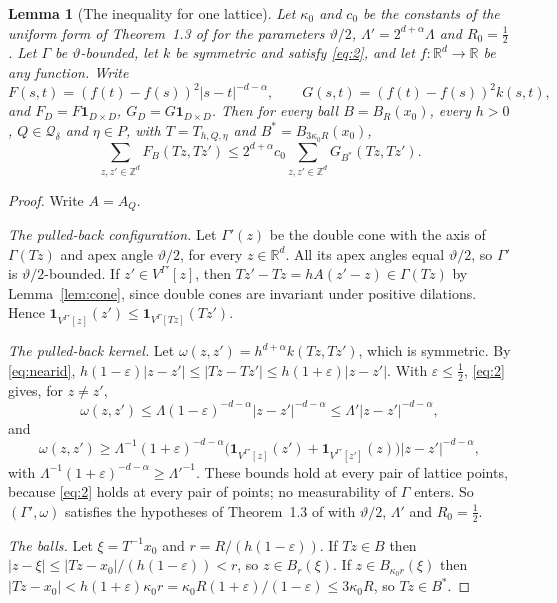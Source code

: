 \documentclass[11pt]{amsart}
\newtheorem{lemma}{Lemma}
\theoremstyle{remark}
\newcommand{\R}{\mathbb{R}}
\newcommand{\Z}{\mathbb{Z}}
\newcommand{\norm}[1]{\lvert #1\rvert}
\newcommand{\1}{\mathbf{1}}
\newcommand{\Qd}{\mathcal{Q}_\delta}
\begin{document}
\begin{lemma}[The inequality for one lattice]\label{lem:onelattice}
Let $\kappa_0$ and $c_0$ be the constants of the uniform form of Theorem~1.3 of \cite{BKS} for the parameters
$\vartheta/2$, $\Lambda'=2^{d+\alpha}\Lambda$ and $R_0=\tfrac12$. Let $\Gamma$ be
$\vartheta$-bounded, let $k$ be symmetric and satisfy \eqref{eq:2}, and let $f\colon\R^d\to\R$ be
any function. Write
\[
  F(s,t)=(f(t)-f(s))^2\norm{s-t}^{-d-\alpha},\qquad G(s,t)=(f(t)-f(s))^2k(s,t),
\]
and $F_D=F\1_{D\times D}$, $G_D=G\1_{D\times D}$. Then for every ball $B=B_R(x_0)$, every $h>0$,
$Q\in\Qd$ and $\eta\in P$, with $T=T_{h,Q,\eta}$ and $B^*=B_{3\kappa_0R}(x_0)$,
\[
  \sum_{z,z'\in\Z^d}F_B(Tz,Tz')\le 2^{d+\alpha}c_0\sum_{z,z'\in\Z^d}G_{B^*}(Tz,Tz').
\]
\end{lemma}

\begin{proof}
Write $A=A_Q$.

\emph{The pulled-back configuration.} Let $\Gamma'(z)$ be the double cone with the axis of
$\Gamma(Tz)$ and apex angle $\vartheta/2$, for every $z\in\R^d$. All its apex angles equal
$\vartheta/2$, so $\Gamma'$ is $\vartheta/2$-bounded. If
$z'\in V^{\Gamma'}[z]$, then $Tz'-Tz=hA(z'-z)\in\Gamma(Tz)$ by Lemma~\ref{lem:cone}, since double
cones are invariant under positive dilations. Hence
$\1_{V^{\Gamma'}[z]}(z')\le\1_{V^\Gamma[Tz]}(Tz')$.

\emph{The pulled-back kernel.} Let $\omega(z,z')=h^{d+\alpha}k(Tz,Tz')$, which is symmetric. By
\eqref{eq:nearid}, $h(1-\varepsilon)\norm{z-z'}\le\norm{Tz-Tz'}\le h(1+\varepsilon)\norm{z-z'}$.
With $\varepsilon\le\tfrac12$, \eqref{eq:2} gives, for $z\ne z'$,
\[
  \omega(z,z')\le\Lambda(1-\varepsilon)^{-d-\alpha}\norm{z-z'}^{-d-\alpha}
    \le\Lambda'\norm{z-z'}^{-d-\alpha},
\]
and
\[
  \omega(z,z')\ge\Lambda^{-1}(1+\varepsilon)^{-d-\alpha}
    \bigl(\1_{V^{\Gamma'}[z]}(z')+\1_{V^{\Gamma'}[z']}(z)\bigr)\norm{z-z'}^{-d-\alpha},
\]
with $\Lambda^{-1}(1+\varepsilon)^{-d-\alpha}\ge\Lambda'^{-1}$. These bounds hold at every pair
of lattice points, because \eqref{eq:2} holds at every pair of points; no measurability of
$\Gamma$ enters. So $(\Gamma',\omega)$ satisfies the hypotheses of Theorem~1.3 of \cite{BKS} with
$\vartheta/2$, $\Lambda'$ and $R_0=\tfrac12$.

\emph{The balls.} Let $\xi=T^{-1}x_0$ and $r=R/(h(1-\varepsilon))$. If $Tz\in B$ then
$\norm{z-\xi}\le\norm{Tz-x_0}/(h(1-\varepsilon))<r$, so $z\in B_r(\xi)$. If $z\in B_{\kappa_0r}(\xi)$
then $\norm{Tz-x_0}<h(1+\varepsilon)\kappa_0r=\kappa_0R(1+\varepsilon)/(1-\varepsilon)\le3\kappa_0R$,
so $Tz\in B^*$.


\end{proof}
\end{document}
